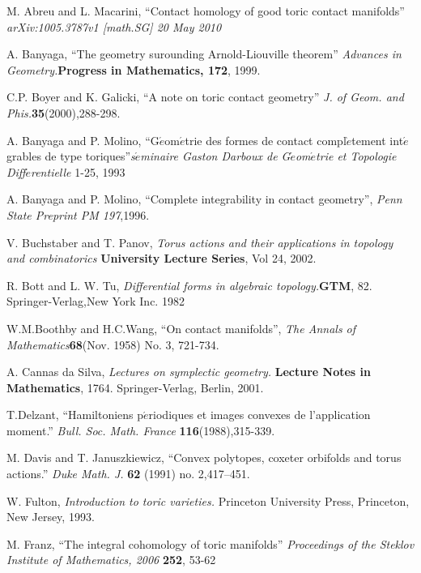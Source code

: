 \documentclass[12pt]{amsart}
\theoremstyle{definition}
\numberwithin{equation}{section}
\begin{document}

\begin{thebibliography}{EHKVI}

M. Abreu and L. Macarini, ``Contact homology of good toric contact
manifolds'' {\em arXiv:1005.3787v1 [math.SG] 20 May 2010}

A. Banyaga, ``The geometry surounding Arnold-Liouville theorem''{\em
Advances in Geometry.}{\bf Progress in Mathematics, 172}, 1999.

C.P. Boyer and K. Galicki, ``A note on toric contact geometry''{\em
J. of Geom. and Phis.}{\bf 35}(2000),288-298.

A. Banyaga and P. Molino, ``G$\acute{e}$om$\acute{e}$trie des formes
de contact compl$\grave{e}$tement int$\acute{e}$grables de type
toriques''{\em s$\acute{e}$minaire Gaston Darboux de
G$\acute{e}$om$\acute{e}$trie et Topologie Diff$\acute{e}$rentielle}
1-25, 1993

A. Banyaga and P. Molino, ``Complete integrability in contact
geometry'', {\em Penn State Preprint PM 197},1996.

V. Buchstaber and T. Panov, {\em Torus actions and their
applications in topology and combinatorics} {\bf University Lecture
Series}, Vol 24, 2002.

 R. Bott and L. W. Tu, {\em Differential forms
in algebraic topology.}{\bf GTM}, 82. Springer-Verlag,New York Inc.
1982

W.M.Boothby and H.C.Wang, ``On contact manifolds'', {\em The Annals
of Mathematics}{\bf 68}(Nov. 1958) No. 3, 721-734.

 A. Cannas da Silva, {\em Lectures on symplectic
geometry.} {\bf Lecture Notes in Mathematics}, 1764.
Springer-Verlag, Berlin, 2001.

 T.Delzant, ``Hamiltoniens p$\acute{e}$riodiques et images convexes de l'application
moment.'' {\em Bull. Soc. Math. France} {\bf 116}(1988),315-339.

M. Davis and T. Januszkiewicz, ``Convex polytopes, coxeter orbifolds
and torus actions.'' {\em Duke Math. J.} {\bf 62} (1991) no.
2,417--451.

 W. Fulton, {\em Introduction to toric
varieties.} Princeton University Press, Princeton, New Jersey, 1993.

M. Franz, ``The integral cohomology of toric manifolds'' {\em
Proceedings of the Steklov Institute of Mathematics, 2006} {\bf
252}, 53-62


\end{thebibliography}
\end{document}
